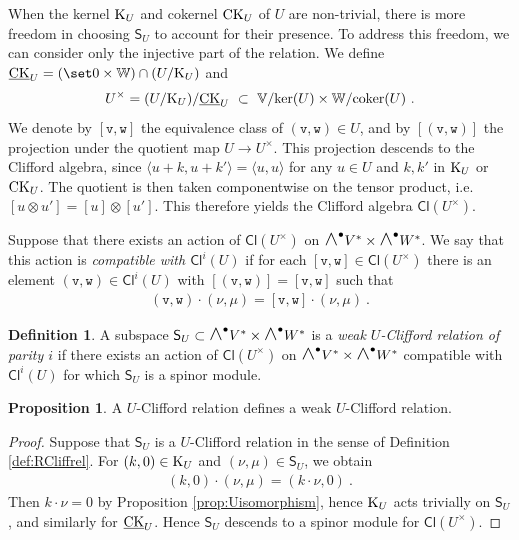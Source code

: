 \documentclass[a4paper, reqno, 11pt]{amsart}
\numberwithin{equation}{section}
\theoremstyle{definition}
\newtheorem{definition}[equation]{Definition}
\newtheorem{proposition}[equation]{Proposition}
\newcommand{\ip}[1]{\langle #1 \rangle}
\newcommand{\red}[1]{\underline{#1}}
\newcommand{\IV}{\mathbb{V}}
\newcommand{\IW}{\mathbb{W}}
\newcommand{\Cl}{\mathsf{Cl}}
\newcommand{\sfS}{{\mathsf{S}}}
\newcommand{\midwedge}{\text {\Large$\wedge$}}
\theoremstyle{remark}
\begin{document}
When the  kernel ${\rm K}_U$ and cokernel ${\rm CK}_U$ of $U$ are non-trivial, there is more freedom in choosing $\sfS_U$ to account for their presence. To address this freedom, we can consider only the injective part of the relation. We define $\red{\rm CK}_U = (\set 0 \times \IW ) \cap (U / {\rm K}_U)$ and
\begin{align}
    U^\times = (U/{\rm K}_U)/\red{\rm CK}_U \ \subset \ \IV/{\rm ker}(U) \times \IW / {\rm coker}(U) \ .
\end{align}
We denote by $[\texttt{v},\texttt{w}]$ the equivalence class of $(\texttt{v},\texttt{w}) \in U$, and by $[(\texttt{v},\texttt{w})]$ the projection under the quotient map $U \to U^\times$. This projection descends to the Clifford algebra, since $\ip{u+k, u+k'} = \ip{u,u}$ for any $u\in U$ and $k,k'$ in ${\rm K}_U$ or ${\rm CK}_U$. The quotient is then taken componentwise on the tensor product, i.e. $[u\otimes u'] = [u]\otimes [u']$. This therefore yields the Clifford algebra $\Cl(U^\times)$.

Suppose that there exists an action of $\Cl(U^\times)$ on $\midwedge^\bullet V^* \times \midwedge^\bullet W^*$. We say that this action is \emph{compatible with $\Cl^i(U)$} if for each $[\texttt{v},\texttt{w}] \in \Cl(U^\times)$ there is an element $(\texttt{v},\texttt{w})\in \Cl^i(U)$ with $[(\texttt{v},\texttt{w})] = [\texttt{v},\texttt{w}]$ such that
\begin{align}
    (\texttt{v},\texttt{w}) \cdot (\nu, \mu) = [\texttt{v},\texttt{w}] \cdot (\nu,\mu) \ .
\end{align}

\begin{definition}\label{def:RCliffrel2}
    A subspace $\sfS_U \subset \midwedge^\bullet V^* \times \midwedge^\bullet W^*$ is a \emph{weak $U$-Clifford relation of parity $i$} if there exists an action of $\Cl(U^\times)$ on $\midwedge^\bullet V^* \times \midwedge^\bullet W^*$ compatible with $\Cl^i(U)$ for which $\sfS_U$ is a spinor module.
\end{definition}

\begin{proposition}\label{prop:strong=weak}
    A $U$-Clifford relation defines a weak $U$-Clifford relation.
\end{proposition}

\begin{proof}
    Suppose that $\sfS_U$ is a $U$-Clifford relation in the sense of Definition \ref{def:RCliffrel}. For $(k,0) \in {\rm K}_U$ and $(\nu, \mu)\in \sfS_U$, we obtain
    \begin{align}
        (k,0)\cdot (\nu, \mu) = (k\cdot \nu, 0) \ .
    \end{align}
    Then $k\cdot \nu = 0$ by Proposition \ref{prop:Uisomorphism}, hence ${\rm K}_U$ acts trivially on $\sfS_U$, and similarly for $\red{\rm CK}_U$. Hence $\sfS_U$ descends to a spinor module for $\Cl(U^\times)$.
\end{proof}
\end{document}
